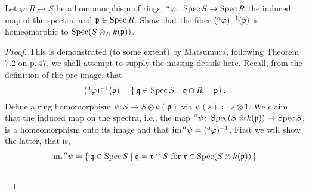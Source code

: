 \begin{problem}
Let $\varphi\colon R\to S$ be a homomorphism of rings,
$\prescript{a}{}{\varphi}\colon \operatorname{Spec} S\to\operatorname{Spec} R$ the induced map of the
spectra, and $\mathfrak{p}\in\operatorname{Spec} R$. Show that the fiber
$(\prescript{a}{}{\varphi})^{-1}(\mathfrak{p})$ is homeomorphic to
$\operatorname{Spec}(S\otimes_R k(\mathfrak{p}))$.
\end{problem}
\begin{proof}
This is demonstrated (to some extent) by Matsumura, following Theorem 7.2
on p.\,47, we shall attempt to supply the missing details
here. Recall, from the definition of the pre-image, that
\[
(\prescript{a}{}{\varphi})^{-1}(\mathfrak{p})=
\left\{\,\mathfrak{q}\in\operatorname{Spec} S\;\middle|\;\,\mathfrak{q}\cap R=\mathfrak{p}\right\}.
\]
Define a ring homomorphism $\psi\colon S\to S\otimes
k(\mathfrak{p})$ via $\psi(s)\coloneqq s\otimes 1$. We claim that
the induced map on the spectra, i.e., the map
$\prescript{a}{}{\psi}\colon\operatorname{Spec}(S\otimes
k(\mathfrak{p}))\to\operatorname{Spec} S$, is a homeomorphism onto its image
and that
$\operatorname{im}\prescript{a}{}{\psi}=(\prescript{a}{}{\varphi})^{-1}$. First
we will show the latter, that is,
\begin{align*}
\operatorname{im}\prescript{a}{}{\psi}
&=\left\{\,\mathfrak{q}\in\operatorname{Spec}
  S\;\middle|\;\text{$\mathfrak{q}=\mathfrak{r}\cap S$ for
  $\mathfrak{r}\in\operatorname{Spec}(S\otimes k(\mathfrak{p}))$}\,\right\}\\
&=
\end{align*}
\end{proof}
